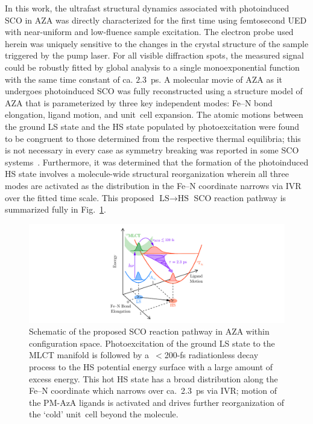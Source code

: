 In this work, the ultrafast structural dynamics associated with photoinduced SCO
in AZA was directly characterized for the first time using femtosecond UED with
near-uniform and low-fluence sample excitation.
%
The electron probe used herein was uniquely sensitive to
the changes in the crystal structure of the sample triggered by the pump laser.
%
For all visible diffraction spots, the measured signal could be robustly fitted
by global analysis to a single monoexponential function with the same time constant of ca. $2.3$~ps.
%
A molecular movie of AZA as it undergoes photoinduced SCO
was fully reconstructed using a structure model of AZA that is parameterized
by three key independent modes: Fe--N bond elongation, ligand motion, and unit~cell expansion.
%
The atomic motions between the ground LS state and the HS state populated by photoexcitation
were found to be congruent to those determined from the respective thermal equilibria;
this is not necessary in every case as symmetry breaking was reported
in some SCO systems~\cite{Brefuel2009, Brefuel2010}.
%
Furthermore, it was determined that the formation of the photoinduced HS state
involves a molecule-wide structural reorganization
wherein all three modes are activated as the distribution in the Fe--N coordinate
narrows via IVR over the fitted time scale.
%
This proposed $\text{LS} \rightarrow \text{HS}$ SCO reaction pathway is summarized fully in
Fig.~\ref{fig: AZA-picture}.

\begin{figure}[ht!]
  \centering
  \includegraphics[width = \textwidth]{Figures/fig_AZA_picture.pdf}
  \caption[Schematic of the proposed SCO reaction pathway in AZA.]{
    Schematic of the proposed SCO reaction pathway in AZA
    within configuration space.
    Photoexcitation of the ground LS state to the MLCT manifold is followed by
    a~$<$200-fs radiationless decay process to the HS potential energy surface
    with a large amount of excess energy.
    This hot HS state has a broad distribution along the Fe--N coordinate
    which narrows over ca.~2.3~ps via IVR;
    motion of the PM-AzA ligands is activated and drives further reorganization of
    the `cold' unit~cell beyond the molecule.
  }
  \label{fig: AZA-picture}
\end{figure}
